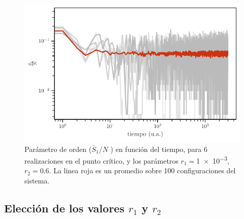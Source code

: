 \begin{figure}[h!]
	\centering\includegraphics[width=\imsize]{transitorio.pdf}
	\caption[Parámetro de orden ($\bar{S}_1/N$ ) en función del tiempo, para 6 realizaciones  en el punto crítico, y los parámetros $r_1=$\num{1e-3}, $r_2 = 0.6$. La linea roja es un promedio sobre 100 configuraciones del sistema.]{Parámetro de orden ($\bar{S}_1/N$ ) en función del tiempo, para 6 realizaciones  en el punto crítico, y los parámetros $r_1=$\num{1e-3}, $r_2 = 0.6$. La linea roja es un promedio sobre 100 configuraciones del sistema.}\label{fig:transitorio}
\end{figure}


\subsection{Elección de los valores $r_1$ y $r_2$}

